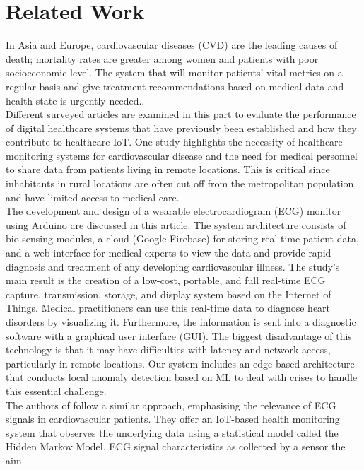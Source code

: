 \documentclass{bmcart}
\begin{document}
\section*{Related Work}
In Asia and Europe, cardiovascular diseases (CVD) are the leading causes of
death; mortality rates are greater among women and patients with poor
socioeconomic level. The system that will monitor patients' vital metrics on a
regular basis and give treatment recommendations based on medical data and
health state is urgently needed.\cite{app12010519}.\\
Different surveyed articles are examined in this part to evaluate the
performance of digital healthcare systems that have previously been established
and how they contribute to healthcare IoT. One study \cite{Varshney2019IoTBE} highlights the
necessity of healthcare monitoring systems for cardiovascular disease and the
need for medical personnel to share data from patients living in remote
locations. This is critical since inhabitants in rural locations are often cut
off from the metropolitan population and have limited access to medical care.\\
The development and design of a wearable electrocardiogram (ECG) monitor using
Arduino are discussed in this article. The system architecture consists of
bio-sensing modules, a cloud (Google Firebase) for storing real-time patient
data, and a web interface for medical experts to view the data and provide rapid
diagnosis and treatment of any developing cardiovascular illness. The study's
main result is the creation of a low-cost, portable, and full real-time ECG
capture, transmission, storage, and display system based on the Internet of
Things. Medical practitioners can use this real-time data to diagnose heart
disorders by   visualizing it. Furthermore, the information is sent into a
diagnostic software with a graphical user interface (GUI). The biggest
disadvantage of this technology is that it may have difficulties with latency
and network access, particularly in remote locations. Our system includes an
edge-based architecture that conducts local anomaly detection based on ML to
deal with crises to handle this essential challenge.\\
The authors of \cite{0a1fa6938fc34df1a7b0b24631b3a22c} follow a similar approach, emphasising the relevance of ECG
signals in cardiovascular patients. They offer an IoT-based health monitoring
system that observes the underlying data using a statistical model called the
Hidden Markov Model. ECG signal characteristics as collected by a sensor the aim
\end{document}
